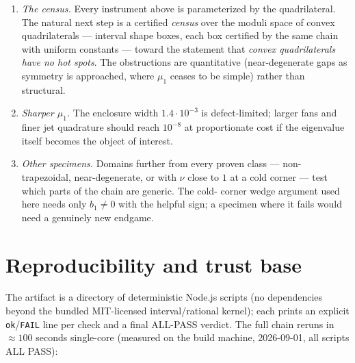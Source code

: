 \documentclass[11pt]{article}
\begin{document}
\begin{enumerate}
\item \emph{The census.} Every instrument above is parameterized by the
quadrilateral. The natural next step is a certified \emph{census} over
the moduli space of convex quadrilaterals --- interval shape boxes,
each box certified by the same chain with uniform constants --- toward
the statement that \emph{convex quadrilaterals have no hot spots}. The
obstructions are quantitative (near-degenerate gaps as symmetry is
approached, where $\mu_1$ ceases to be simple) rather than structural.
\item \emph{Sharper $\mu_1$.} The enclosure width $1.4\cdot10^{-3}$ is
defect-limited; larger fans and finer jet quadrature should reach
$10^{-8}$ at proportionate cost if the eigenvalue itself becomes the
object of interest.
\item \emph{Other specimens.} Domains further from every proven class
--- non-trapezoidal, near-degenerate, or with $\nu$ close to $1$ at a
cold corner --- test which parts of the chain are generic. The cold-%
corner wedge argument used here needs only $b_1\ne0$ with the helpful
sign; a specimen where it fails would need a genuinely new endgame.
\end{enumerate}



\appendix

\section{Reproducibility and trust base}\label{app:repro}

The artifact is a directory of deterministic Node.js scripts (no
dependencies beyond the bundled MIT-licensed interval/rational kernel);
each prints an explicit \texttt{ok}/\texttt{FAIL} line per check and a
final ALL-PASS verdict. The full chain reruns in ${\approx}100$ seconds
single-core (measured on the build machine, 2026-09-01, all scripts
ALL PASS):
\end{document}
